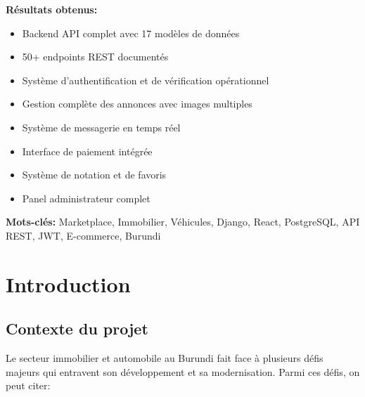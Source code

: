 \documentclass[12pt,a4paper]{report}
\begin{document}
\vspace{0.5cm}

\textbf{Résultats obtenus:}
\begin{itemize}[noitemsep]
    \item Backend API complet avec 17 modèles de données
    \item 50+ endpoints REST documentés
    \item Système d'authentification et de vérification opérationnel
    \item Gestion complète des annonces avec images multiples
    \item Système de messagerie en temps réel
    \item Interface de paiement intégrée
    \item Système de notation et de favoris
    \item Panel administrateur complet
\end{itemize}

\vspace{0.5cm}

\textbf{Mots-clés:} Marketplace, Immobilier, Véhicules, Django, React, PostgreSQL, API REST, JWT, E-commerce, Burundi

\newpage

\tableofcontents
\newpage

\listoffigures
\newpage

\listoftables
\newpage

\chapter{Introduction}

\section{Contexte du projet}

Le secteur immobilier et automobile au Burundi fait face à plusieurs défis majeurs qui entravent son développement et sa modernisation. Parmi ces défis, on peut citer:
\end{document}
